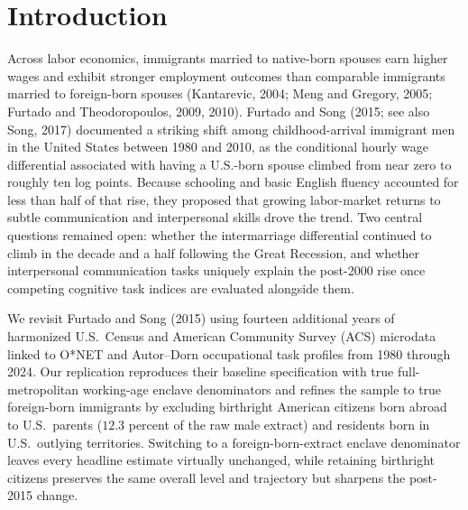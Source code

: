 \documentclass[11pt]{article}
\begin{document}
\begin{list}{}{%
  \setlength{\leftmargin}{0.45in}%
  \setlength{\rightmargin}{0.45in}%
  \setlength{\parsep}{0pt}%
  \setlength{\topsep}{0pt}%
  \setlength{\itemsep}{0pt}%
  \setlength{\listparindent}{1.5em}%
}
\vspace{0.6em}
\end{list}

\vspace{1.0em}
\section{Introduction}
Across labor economics, immigrants married to native-born spouses earn higher wages and exhibit stronger employment outcomes than comparable immigrants married to foreign-born spouses (Kantarevic, 2004; Meng and Gregory, 2005; Furtado and Theodoropoulos, 2009, 2010). Furtado and Song (2015; see also Song, 2017) documented a striking shift among childhood-arrival immigrant men in the United States between 1980 and 2010, as the conditional hourly wage differential associated with having a U.S.-born spouse climbed from near zero to roughly ten log points. Because schooling and basic English fluency accounted for less than half of that rise, they proposed that growing labor-market returns to subtle communication and interpersonal skills drove the trend. Two central questions remained open: whether the intermarriage differential continued to climb in the decade and a half following the Great Recession, and whether interpersonal communication tasks uniquely explain the post-2000 rise once competing cognitive task indices are evaluated alongside them.

We revisit Furtado and Song (2015) using fourteen additional years of harmonized U.S.\ Census and American Community Survey (ACS) microdata linked to O*NET and Autor--Dorn occupational task profiles from 1980 through 2024. Our replication reproduces their baseline specification with true full-metropolitan working-age enclave denominators and refines the sample to true foreign-born immigrants by excluding birthright American citizens born abroad to U.S.\ parents ($12.3$ percent of the raw male extract) and residents born in U.S.\ outlying territories. Switching to a foreign-born-extract enclave denominator leaves every headline estimate virtually unchanged, while retaining birthright citizens preserves the same overall level and trajectory but sharpens the post-2015 change.
\end{document}
